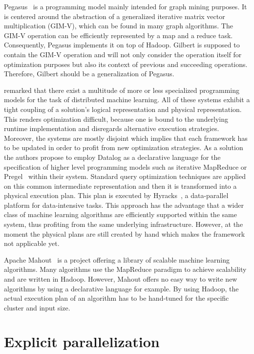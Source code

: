 Pegasus~\cite{kang:2009a} is a programming model mainly intended for graph mining purposes.
It is centered around the abstraction of a generalized iterative matrix vector multiplication (GIM-V), which can be found in many graph algorithms.
The GIM-V operation can be efficiently represented by a map and a reduce task.
Consequently, Pegasus implements it on top of Hadoop.
Gilbert is supposed to contain the GIM-V operation and will not only consider the operation itself for optimization purposes but also its context of previous and succeeding operations.
Therefore, Gilbert should be a generalization of Pegasus.

\Textcite{bu:apa2012a} remarked that there exist a multitude of more or less specialized programming models for the task of distributed machine learning.
All of these systems exhibit a tight coupling of a solution's logical representation and physical representation.
This renders optimization difficult, because one is bound to the underlying runtime implementation and disregards alternative execution strategies.
Moreover, the systems are mostly disjoint which implies that each framework has to be updated in order to profit from new optimization strategies.
As a solution the authors propose to employ Datalog as a declarative language for the specification of higher level programming models such as iterative MapReduce or Pregel~\cite{malewicz:2010a} within their system.
Standard query optimization techniques are applied on this common intermediate representation and then it is transformed into a physical execution plan.
This plan is executed by Hyracks~\cite{borkar:2011a}, a data-parallel platform for data-intensive tasks.
This approach has the advantage that a wider class of machine learning algorithms are efficiently supported within the same system, thus profiting from the same underlying infrastructure.
However, at the moment the physical plans are still created by hand which makes the framework not applicable yet.

Apache Mahout~\cite{mahout:2011a} is a project offering a library of scalable machine learning algorithms.
Many algorithms use the MapReduce paradigm to achieve scalability and are written in Hadoop.
However, Mahout offers no easy way to write new algorithms by using a declarative language for example.
By using Hadoop, the actual execution plan of an algorithm has to be hand-tuned for the specific cluster and input size.

\section{Explicit parallelization}
